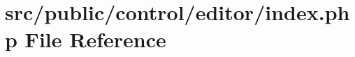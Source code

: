 \hypertarget{control_2editor_2index_8php}{}\section{src/public/control/editor/index.php File Reference}
\label{control_2editor_2index_8php}
